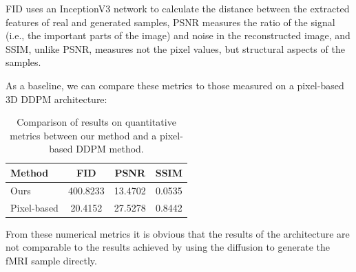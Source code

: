 	
	FID uses an InceptionV3\cite{szegedy2016rethinking} network to calculate the distance between the extracted features of real and generated samples, PSNR measures the ratio of the signal (i.e., the important parts of the image) and noise in the reconstructed image, and SSIM, unlike PSNR, measures not the pixel values, but structural aspects of the samples.
	
	As a baseline, we can compare these metrics to those measured on a pixel-based 3D DDPM architecture\cite{diff_pixel}:
	
	\begin{table}[!h]
		\begin{center}
			\begin{tabular}{lccc}
				\toprule
				Method & FID & PSNR & SSIM \\
				\midrule
				Ours & 400.8233 & 13.4702 & 0.0535 \\
				Pixel-based & 20.4152 & 27.5278 & 0.8442\\
				\bottomrule
			\end{tabular}
		\end{center}
		\caption{Comparison of results on quantitative metrics between our method and a pixel-based DDPM method.}
	\end{table}
	
	From these numerical metrics it is obvious that the results of the architecture are not comparable to the results achieved by using the diffusion to generate the fMRI sample directly. 
	
